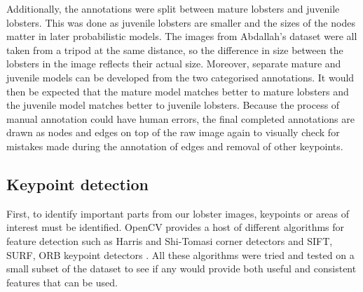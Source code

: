 \noindent
Additionally, the annotations were split between mature lobsters and juvenile lobsters. This was done as juvenile lobsters are smaller and the sizes of the nodes matter in later probabilistic models. The images from Abdallah's dataset were all taken from a tripod at the same distance, so the difference in size between the lobsters in the image reflects their actual size. Moreover, separate mature and juvenile models can be developed from the two categorised annotations. It would then be expected that the mature model matches better to mature lobsters and the juvenile model matches better to juvenile lobsters. 
\n
Because the process of manual annotation could have human errors, the final completed annotations are drawn as nodes and edges on top of the raw image again to visually check for mistakes made during the annotation of edges and removal of other keypoints.


\subsection{Keypoint detection}\label{sec:kp-detection}
First, to identify important parts from our lobster images, keypoints or areas of interest must be identified. OpenCV provides a host of different algorithms for feature detection such as Harris and Shi-Tomasi corner detectors and SIFT, SURF, ORB keypoint detectors \cite{opencv-tut1}. All these algorithms were tried and tested on a small subset of the dataset to see if any would provide both useful and consistent features that can be used. 

